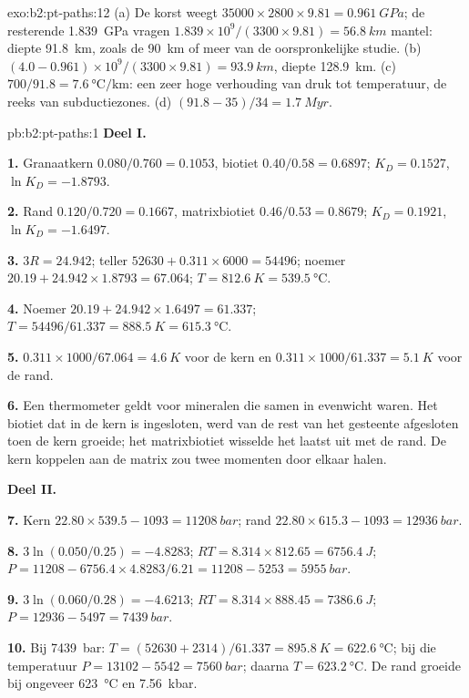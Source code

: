 \begin{solution}{exo:b2:pt-paths:12}
(a) De korst weegt $35000\times2800\times9.81 = \qty{0.961}{GPa}$; de resterende
\qty{1.839}{GPa} vragen $1.839\times10^9/(3300\times9.81) = \qty{56.8}{km}$ mantel: diepte
\qty{91.8}{km}, zoals de \qty{90}{km} of meer van de oorspronkelijke studie. (b) $(4.0 -
0.961)\times10^9/(3300\times9.81) = \qty{93.9}{km}$, diepte \qty{128.9}{km}.
(c) $700/91.8 = \qty{7.6}{\celsius\per\km}$: een zeer hoge verhouding van druk tot
temperatuur, de reeks van subductiezones. (d) $(91.8 - 35)/34 = \qty{1.7}{Myr}$.
\end{solution}

\begin{solution}{pb:b2:pt-paths:1}
\noindent\textbf{Deel I.}

\textbf{1.} Granaatkern $0.080/0.760 = 0.1053$, biotiet $0.40/0.58 = 0.6897$; $K_D =
0.1527$, $\ln K_D = -1.8793$.

\textbf{2.} Rand $0.120/0.720 = 0.1667$, matrixbiotiet $0.46/0.53 = 0.8679$; $K_D =
0.1921$, $\ln K_D = -1.6497$.

\textbf{3.} $3R = 24.942$; teller $52630 + 0.311\times6000 = 54496$; noemer $20.19
+ 24.942\times1.8793 = 67.064$; $T = \qty{812.6}{K} = \qty{539.5}{\celsius}$.

\textbf{4.} Noemer $20.19 + 24.942\times1.6497 = 61.337$; $T = 54496/61.337 =
\qty{888.5}{K} = \qty{615.3}{\celsius}$.

\textbf{5.} $0.311\times1000/67.064 = \qty{4.6}{K}$ voor de kern en $0.311\times1000/61.337
= \qty{5.1}{K}$ voor de rand.

\textbf{6.} Een thermometer geldt voor mineralen die samen in evenwicht waren. Het
biotiet dat in de kern is ingesloten, werd van de rest van het gesteente afgesloten toen de kern groeide;
het matrixbiotiet wisselde het laatst uit met de rand. De kern koppelen aan de matrix zou
twee momenten door elkaar halen.

\noindent\textbf{Deel II.}

\textbf{7.} Kern $22.80\times539.5 - 1093 = \qty{11208}{bar}$; rand $22.80\times615.3 -
1093 = \qty{12936}{bar}$.

\textbf{8.} $3\ln(0.050/0.25) = -4.8283$; $RT = 8.314\times812.65 = \qty{6756.4}{J}$; $P =
11208 - 6756.4\times4.8283/6.21 = 11208 - 5253 = \qty{5955}{bar}$.

\textbf{9.} $3\ln(0.060/0.28) = -4.6213$; $RT = 8.314\times888.45 = \qty{7386.6}{J}$; $P
= 12936 - 5497 = \qty{7439}{bar}$.

\textbf{10.} Bij \qty{7439}{bar}: $T = (52630 + 2314)/61.337 = \qty{895.8}{K} =
\qty{622.6}{\celsius}$; bij die temperatuur $P = 13102 - 5542 = \qty{7560}{bar}$; daarna $T
= \qty{623.2}{\celsius}$. De rand groeide bij ongeveer \qty{623}{\celsius} en \qty{7.56}{kbar}.


\end{solution}
